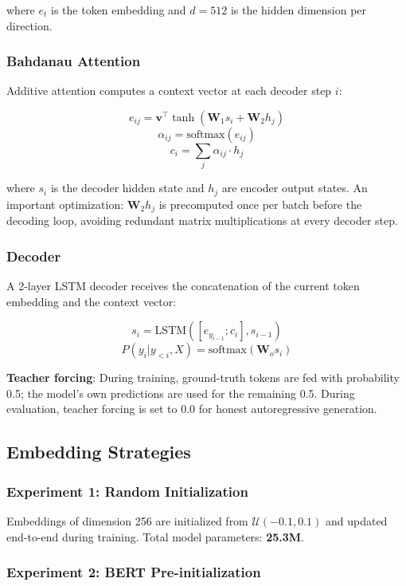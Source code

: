 \documentclass[12pt,a4paper]{article}
\begin{document}
where $e_t$ is the token embedding and $d = 512$ is the hidden dimension per direction.

\subsubsection{Bahdanau Attention}

Additive attention computes a context vector at each decoder step $i$:

\[
e_{ij} = \mathbf{v}^\top \tanh(\mathbf{W}_1 s_i + \mathbf{W}_2 h_j)
\]
\[
\alpha_{ij} = \text{softmax}(e_{ij})
\]
\[
c_i = \sum_j \alpha_{ij} \cdot h_j
\]

where $s_i$ is the decoder hidden state and $h_j$ are encoder output states.
An important optimization: $\mathbf{W}_2 h_j$ is precomputed once per batch before the decoding loop, avoiding redundant matrix multiplications at every decoder step.

\subsubsection{Decoder}

A 2-layer LSTM decoder receives the concatenation of the current token embedding and the context vector:

\[
s_i = \text{LSTM}([e_{y_{i-1}}; c_i], s_{i-1})
\]
\[
P(y_i | y_{<i}, X) = \text{softmax}(\mathbf{W}_o s_i)
\]

\textbf{Teacher forcing}: During training, ground-truth tokens are fed with probability 0.5; the model's own predictions are used for the remaining 0.5. During evaluation, teacher forcing is set to 0.0 for honest autoregressive generation.

\subsection{Embedding Strategies}

\subsubsection{Experiment 1: Random Initialization}

Embeddings of dimension 256 are initialized from $\mathcal{U}(-0.1, 0.1)$ and updated end-to-end during training. Total model parameters: \textbf{25.3M}.

\subsubsection{Experiment 2: BERT Pre-initialization}
\end{document}
